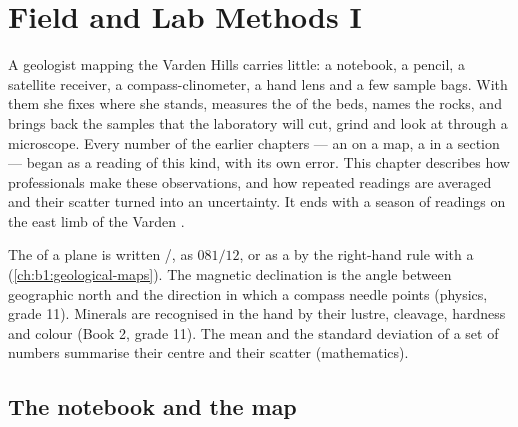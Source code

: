 \chapter{Field and Lab Methods I}\label{ch:b1:field-lab-methods-1}

A geologist mapping the Varden Hills carries little: a notebook, a pencil, a
satellite receiver, a compass-clinometer, a hand lens and a few sample bags.
With them she fixes where she stands, measures the  of the beds, names
the rocks, and brings back the samples that the laboratory will cut, grind and
look at through a microscope. Every number of the earlier chapters --- an
 on a map, a  in a section --- began as a reading of this kind,
with its own error. This chapter describes how professionals make these
observations, and how repeated readings are averaged and their scatter turned
into an uncertainty. It ends with a season of readings on the east limb of the
Varden .

\begin{recall}
The  of a plane is written /, as $081/12$, or as a
 by the right-hand rule with a  (\cref{ch:b1:geological-maps}). The
magnetic declination is the angle between geographic north and the direction
in which a compass needle points (physics, grade 11). Minerals are recognised
in the hand by their lustre, cleavage, hardness and colour (Book 2, grade 11).
The mean and the standard deviation of a set of numbers summarise their centre
and their scatter (mathematics).
\end{recall}

\section{The notebook and the map}

